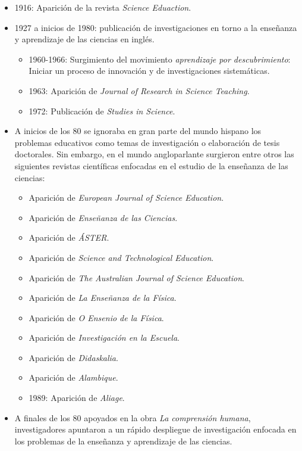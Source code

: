 \documentclass[12pt]{report}
\theoremstyle{largebreak}
\begin{document}
    \begin{itemize}
        \item 1916: Aparición de la revista \textit{Science Eduaction}.
        \item 1927 a inicios de 1980: publicación de investigaciones en torno a la enseñanza y aprendizaje de las ciencias en inglés.
        \begin{itemize}
            \item 1960-1966: Surgimiento del movimiento \textit{aprendizaje por descubrimiento}: Iniciar un proceso de innovación y de investigaciones sistemáticas.
            \item 1963: Aparición de \textit{Journal of Research in Science Teaching}.
        \item 1972: Publicación de \textit{Studies in Science}.
        \end{itemize}
        \item A inicios de los 80 se ignoraba en gran parte del mundo hispano los problemas educativos como temas de investigación o elaboración de tesis doctorales. Sin embargo, en el mundo angloparlante surgieron entre otros las siguientes revistas científicas enfocadas en el estudio de la enseñanza de las ciencias:
        \begin{itemize}
            \item Aparición de \textit{European Journal of Science Education}.
            \item Aparición de \textit{Enseñanza de las Ciencias}.
            \item Aparición de \textit{ÁSTER}.
            \item Aparición de \textit{Science and Technological Education}.
            \item Aparición de \textit{The Australian Journal of Science Education}.
            \item Aparición de \textit{La Enseñanza de la Física}.
            \item Aparición de \textit{O Ensenio de la Física}.
            \item Aparición de \textit{Investigación en la Escuela}.
            \item Aparición de \textit{Didaskalia}.
            \item Aparición de \textit{Alambique}.
            \item 1989: Aparición de \textit{Aliage}.
        \end{itemize}
        \item A finales de los 80 apoyados en la obra \textit{La comprensión humana}, investigadores apuntaron a un rápido despliegue de investigación enfocada en los problemas de la enseñanza y aprendizaje de las ciencias.

\end{itemize}
\end{document}
